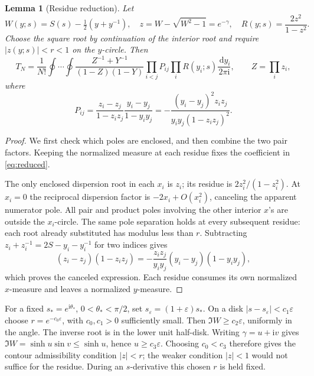 \documentclass[11pt]{article}
\numberwithin{equation}{section}
\newtheorem{lemma}[theorem]{Lemma}
\theoremstyle{definition}
\newcommand{\dd}{\,\mathrm d}
\newcommand{\ii}{\mathrm i}
\newcommand{\eps}{\varepsilon}
\newcommand{\sstar}{s_*}
\newcommand{\se}{s_\varepsilon}
\begin{document}
\begin{lemma}[Residue reduction]\label{lem:residue}
Let
\[
 W(y;s)=S(s)-\tfrac12(y+y^{-1}),\quad
 z=W-\sqrt{W^2-1}=e^{-\gamma},\quad
 R(y;s)=\frac{2z^2}{1-z^2}.
\]
Choose the square root by continuation of the interior root and require
\(\lvert z(y;s)\rvert<r<1\) on the \(y\)-circle. Then
\begin{equation}
 T_N=\frac1{N!}\oint\cdots\oint
 \frac{Z^{-1}+Y^{-1}}{(1-Z)(1-Y)}
 \prod_{i<j}P_{ij}\prod_i R(y_i;s)\frac{\dd y_i}{2\pi\ii},
 \qquad Z=\prod_i z_i,\label{eq:reduced}
\end{equation}
where
\begin{equation}
 P_{ij}=\frac{z_i-z_j}{1-z_iz_j}\frac{y_i-y_j}{1-y_iy_j}
       =-\frac{(y_i-y_j)^2z_iz_j}{y_iy_j(1-z_iz_j)^2}.
 \label{eq:pair}
\end{equation}
\end{lemma}
\begin{proof}
We first check which poles are enclosed, and then combine the two pair factors. Keeping the normalized measure at each residue fixes the coefficient in \eqref{eq:reduced}.

The only enclosed dispersion root in each \(x_i\) is \(z_i\);
its residue is \(2z_i^2/(1-z_i^2)\). At \(x_i=0\) the reciprocal dispersion
factor is \(-2x_i+O(x_i^2)\), canceling the apparent numerator pole.
All pair and product poles involving the other interior \(x\)'s are
outside the \(x_i\)-circle. The same pole separation holds at every subsequent residue: each root
already substituted has modulus less than \(r\).
Subtracting \(z_i+z_i^{-1}=2S-y_i-y_i^{-1}\) for two indices gives
\[
 (z_i-z_j)(1-z_iz_j)
 =-\frac{z_iz_j}{y_iy_j}(y_i-y_j)(1-y_iy_j),
\]
which proves the canceled expression. Each residue consumes its own
normalized \(x\)-measure and leaves a normalized \(y\)-measure.
\end{proof}

For a fixed \(\sstar=e^{\ii\theta_*}\), \(0<\theta_*<\pi/2\), set
\(\se=(1+\eps)\sstar\). On a disk \(\lvert s-\se\rvert<c_1\eps\)
choose \(r=e^{-c_0\eps}\), with \(c_0,c_1>0\) sufficiently small.
Then \(\Im W\ge c_2\eps\), uniformly in the angle. The inverse root is
in the lower unit half-disk. Writing \(\gamma=u+\ii v\) gives
\(\Im W=\sinh u\sin v\le\sinh u\), hence \(u\ge c_3\eps\).
Choosing \(c_0<c_3\) therefore gives the contour admissibility condition
\(|z|<r\); the weaker condition \(|z|<1\) would not suffice for the residue.
During an \(s\)-derivative this chosen \(r\) is held fixed.
\end{document}
